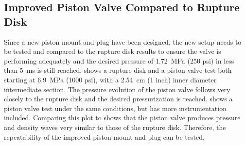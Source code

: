 \subsection{Improved Piston Valve Compared to Rupture Disk} \label{ss:new piston v disk}
Since a new piston mount and plug have been designed, the new setup needs to be tested and compared to the rupture disk results to ensure the valve is performing adequately and the desired pressure of \SI{1.72}{\mega\pascal} (250 psi) in less than \SI{5}{\milli\second} is still reached.  shows a rupture disk and a piston valve test both starting at \SI{6.9}{\mega\pascal} (1000 psi), with a \SI{2.54}{\centi\meter} (1 inch) inner diameter intermediate section. The pressure evolution of the piston valve follows very closely to the rupture disk and the desired pressurization is reached.  shows a piston valve test under the same conditions, but has more instrumentation included. Comparing this plot to  shows that the piston valve produces pressure and density waves very similar to those of the rupture disk. Therefore, the repeatability of the improved piston mount and plug can be tested. 

